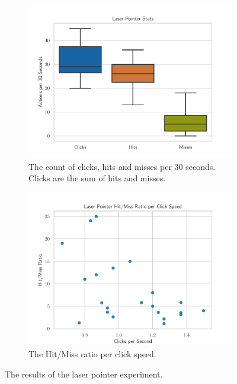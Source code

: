 \begin{figure}[H]
	\centering
	\begin{subfigure}{.48\linewidth}%
		\centering
		\includegraphics[width=\linewidth]{figures/evaluation/eval_exp_lp.pdf}
		\caption{The count of clicks, hits and misses per 30 seconds. Clicks are the sum of hits and misses.}\label{fig:eval-exp-lp}
	\end{subfigure}%
	\hspace{0.02\linewidth}%
	\begin{subfigure}{.48\linewidth}%
		\centering
		\includegraphics[width=\linewidth]{figures/evaluation/eval_exp_lp_ratio_scatter.pdf}
		\caption{The Hit/Miss ratio per click speed.}\label{fig:eval-exp-lp-ratio-scatter} %
	\end{subfigure}%
	\caption[Laser pointer task results]{The results of the laser pointer experiment.}\label{fig:exp-lp-eval}
\end{figure}

